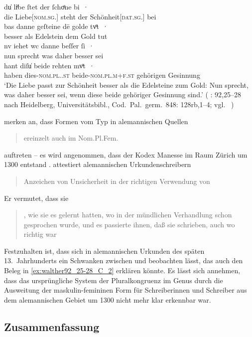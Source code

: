 \begin{exe}
\ex\label{ex:walther92_25-28_C_2}
	\gll du̍ liͤbe ſtet der ſchoͤne bi~· \\
			die Liebe[\textsc{nom.sg.\FemI}] steht der
			Schönheit[\textsc{dat.sg.\FemI}] bei \\
\sn \gll bas danne geſteine dē golde tvͦt~· \\
		besser als Edelstein dem Gold tut \\
\sn \gll nv iehet wc danne beſſer ſi~· \\
		nun sprecht was daher besser sei \\
\sn \gll hant diſu̍ beide rehten mvͦt~· \\
		haben dies-\textsc{nom.pl.\NeutI.st} beide-\textsc{nom.pl.m+f\subI.st}
			gehörigen Gesinnung \\
	\trans `Die Liebe passt zur Schönheit besser als die Edelsteine zum
		Gold: Nun sprecht, was daher besser sei, wenn diese beide gehöriger
		Gesinnung sind.'
		(%
			: 92,25--28 nach
			Heidelberg, Universitätsbibl., Cod.~Pal.~germ.~848: 128rb,1--4;
			vgl.~\cite[356--358]{bein2013}%
		)
	\\
\end{exe}

\citeauthor{ksw2} merken an, dass Formen vom Typ  in alemannischen
Quellen \blockcquote[485]{ksw2}{ereinzelt auch im Nom.Pl.Fem.}
auftreten -- es wird angenommen, dass der Kodex Manesse im Raum Zürich um 1300
entstand \autocite[4957]{hsc}.  attestiert alemannischen
Urkundenschreibern \blockcquote[27]{deboor1976b}{Anzeichen von Unsicherheit in
der richtigen Verwendung von }. Er vermutet, dass sie
\blockcquote[28]{deboor1976b}{ , wie sie es
gelernt hatten, wo in der mündlichen Verhandlung schon  gesprochen
wurde, und es passierte ihnen, daß sie  schrieben, auch wo
 richtig war}. Festzuhalten ist, dass sich in alemannischen Urkunden
des späten 13.~Jahrhunderts ein Schwanken zwischen  und 
beobachten lässt, das auch den Beleg in \cref{ex:walther92_25-28_C_2} erklären
könnte. Es lässt sich annehmen, dass das ursprüngliche System der
Pluralkongruenz im Genus durch die Ausweitung der maskulin-femininen Form für
Schreiberinnen und Schreiber aus dem alemannischen Gebiet um 1300 nicht mehr
klar erkennbar war.

\subsection{Zusammenfassung}

